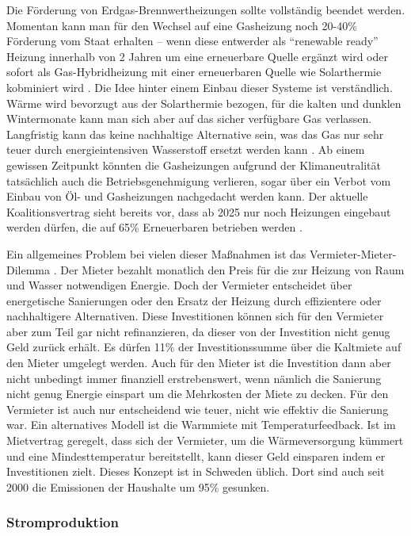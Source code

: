 Die Förderung von Erdgas-Brennwertheizungen sollte vollständig beendet werden. Momentan kann man für den Wechsel auf eine Gasheizung noch 20-40\% Förderung vom Staat erhalten -- wenn diese entwerder als ``renewable ready'' Heizung innerhalb von 2 Jahren um eine erneuerbare Quelle ergänzt wird oder sofort als Gas-Hybridheizung mit einer erneuerbaren Quelle wie Solarthermie kobminiert wird \cite{gasheizung-foerderung}. Die Idee hinter einem Einbau dieser Systeme ist verständlich. Wärme wird bevorzugt aus der Solarthermie bezogen, für die kalten und dunklen Wintermonate kann man sich aber auf das sicher verfügbare Gas verlassen. Langfristig kann das keine nachhaltige Alternative sein, was das Gas nur sehr teuer durch energieintensiven Wasserstoff ersetzt werden kann \cite{agora-wasserstoff}. Ab einem gewissen Zeitpunkt könnten die Gasheizungen aufgrund der Klimaneutralität tatsächlich auch die Betriebsgenehmigung verlieren, sogar über ein Verbot vom Einbau von Öl- und Gasheizungen nachgedacht werden kann. Der aktuelle Koalitionsvertrag sieht bereits vor, dass ab 2025 nur noch Heizungen eingebaut werden dürfen, die auf 65\% Erneuerbaren betrieben werden \cite{clausen2022}.

Ein allgemeines Problem bei vielen dieser Maßnahmen ist das Vermieter-Mieter-Dilemma \cite{agora-mieterschutz-klimaschutz}. 
Der Mieter bezahlt monatlich den Preis für die zur Heizung von Raum und Wasser notwendigen Energie.
Doch der Vermieter entscheidet über energetische Sanierungen oder den Ersatz der Heizung durch effizientere oder nachhaltigere Alternativen. Diese Investitionen können sich für den Vermieter aber zum Teil gar nicht refinanzieren, da dieser von der Investition nicht genug Geld zurück erhält. Es dürfen 11\% der Investitionssumme über die Kaltmiete auf den Mieter umgelegt werden. Auch für den Mieter ist die Investition dann aber nicht unbedingt immer finanziell erstrebenswert, wenn nämlich die Sanierung nicht genug Energie einspart um die Mehrkosten der Miete zu decken. Für den Vermieter ist auch nur entscheidend wie teuer, nicht wie effektiv die Sanierung war. Ein alternatives Modell ist die Warmmiete mit Temperaturfeedback. Ist im Mietvertrag geregelt, dass sich der Vermieter, um die Wärmeversorgung kümmert und eine Mindesttemperatur bereitstellt, kann dieser Geld einsparen indem er Investitionen zielt. Dieses Konzept ist in Schweden üblich. Dort sind auch seit 2000 die Emissionen der Haushalte um 95\% gesunken.

\subsubsection{Stromproduktion}
\label{sec:Stromproduktion}

